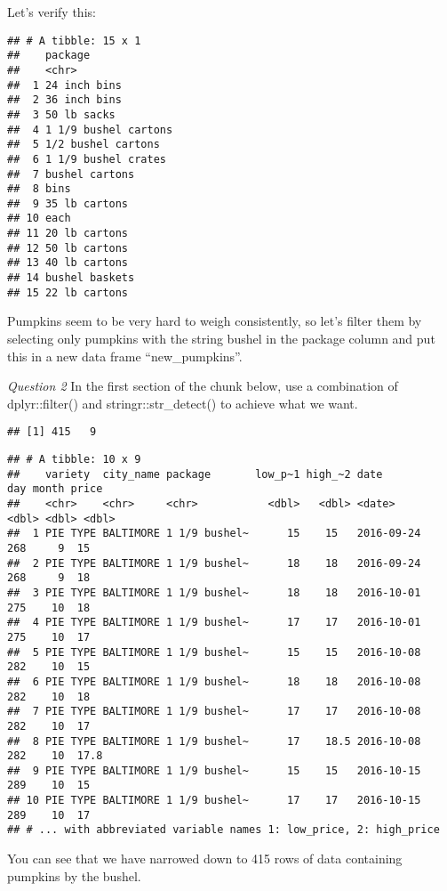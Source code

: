 \documentclass[
]{article}
\begin{document}
Let's verify this:

\begin{verbatim}
## # A tibble: 15 x 1
##    package             
##    <chr>               
##  1 24 inch bins        
##  2 36 inch bins        
##  3 50 lb sacks         
##  4 1 1/9 bushel cartons
##  5 1/2 bushel cartons  
##  6 1 1/9 bushel crates 
##  7 bushel cartons      
##  8 bins                
##  9 35 lb cartons       
## 10 each                
## 11 20 lb cartons       
## 12 50 lb cartons       
## 13 40 lb cartons       
## 14 bushel baskets      
## 15 22 lb cartons
\end{verbatim}

Pumpkins seem to be very hard to weigh consistently, so let's filter
them by selecting only pumpkins with the string bushel in the package
column and put this in a new data frame ``new\_pumpkins''.

\emph{Question 2} In the first section of the chunk below, use a
combination of dplyr::filter() and stringr::str\_detect() to achieve
what we want.

\begin{verbatim}
## [1] 415   9
\end{verbatim}

\begin{verbatim}
## # A tibble: 10 x 9
##    variety  city_name package       low_p~1 high_~2 date         day month price
##    <chr>    <chr>     <chr>           <dbl>   <dbl> <date>     <dbl> <dbl> <dbl>
##  1 PIE TYPE BALTIMORE 1 1/9 bushel~      15    15   2016-09-24   268     9  15  
##  2 PIE TYPE BALTIMORE 1 1/9 bushel~      18    18   2016-09-24   268     9  18  
##  3 PIE TYPE BALTIMORE 1 1/9 bushel~      18    18   2016-10-01   275    10  18  
##  4 PIE TYPE BALTIMORE 1 1/9 bushel~      17    17   2016-10-01   275    10  17  
##  5 PIE TYPE BALTIMORE 1 1/9 bushel~      15    15   2016-10-08   282    10  15  
##  6 PIE TYPE BALTIMORE 1 1/9 bushel~      18    18   2016-10-08   282    10  18  
##  7 PIE TYPE BALTIMORE 1 1/9 bushel~      17    17   2016-10-08   282    10  17  
##  8 PIE TYPE BALTIMORE 1 1/9 bushel~      17    18.5 2016-10-08   282    10  17.8
##  9 PIE TYPE BALTIMORE 1 1/9 bushel~      15    15   2016-10-15   289    10  15  
## 10 PIE TYPE BALTIMORE 1 1/9 bushel~      17    17   2016-10-15   289    10  17  
## # ... with abbreviated variable names 1: low_price, 2: high_price
\end{verbatim}

You can see that we have narrowed down to 415 rows of data containing
pumpkins by the bushel.
\end{document}

